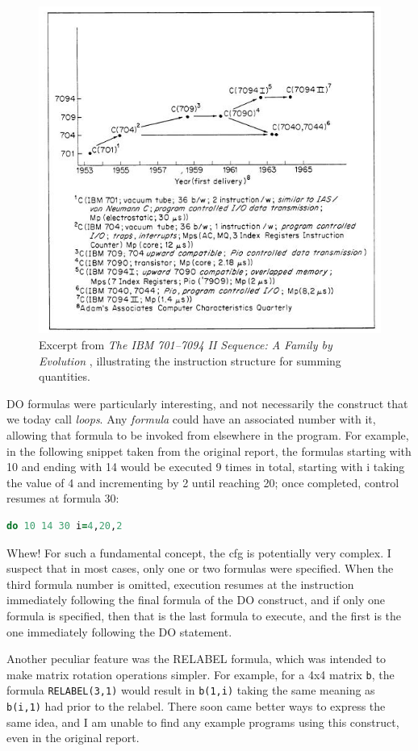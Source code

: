 \begin{figure}[h!]
	\centering
	\includegraphics[width=0.5\linewidth]{resource/ibm-7094.jpeg}
	\caption{Excerpt from \textit{The IBM 701--7094 II Sequence: A
			Family by Evolution}
		\cite{Hamming_Feigenbaum_1971_IBM7094}, illustrating the
		instruction structure for summing quantities.}
	\label{fig:ibm7094-example}
\end{figure}

DO formulas were particularly interesting, and not necessarily the construct that we
today call \textit{loops}.
Any \textit{formula} could have an associated number with it, allowing that formula to be
invoked from elsewhere in the program.
For example, in the following snippet taken from the original report,
the formulas starting with 10 and ending with 14 would be executed
9 times in total, starting with i taking the value of 4 and incrementing by 2
until reaching 20; once completed, control resumes at formula 30:

\begin{lstlisting}[language=fortran,frame=single]
      do 10 14 30 i=4,20,2
\end{lstlisting}

Whew! For such a fundamental concept, the \gls{cfg} is potentially very complex.
I suspect that in most cases, only one or two formulas were specified.
When the third formula number is omitted, execution resumes at the instruction
immediately following the final formula of the DO construct, and
if only one formula is specified, then that is the last formula to execute,
and the first is the one immediately following the DO statement.

Another peculiar feature was the RELABEL formula, which was intended to make
matrix rotation operations simpler. For example, for a 4x4 matrix \texttt{b}, the
formula \texttt{RELABEL(3,1)} would result in \texttt{b(1,i)} taking the same meaning as \texttt{b(i,1)}
had prior to the relabel.
There soon came better ways to express the same idea, and I am unable to find any example
programs using this construct, even in the original report.

